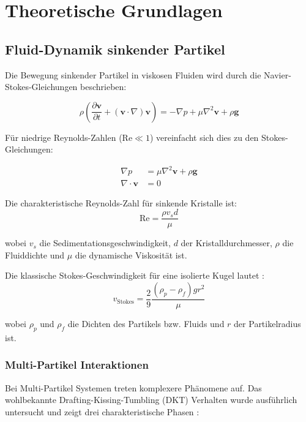 \documentclass[12pt,twoside,openright]{scrreprt}
\newcommand{\grad}{\nabla}
\newcommand{\divg}{\nabla \cdot}
\newcommand{\laplacian}{\nabla^2}
\theoremstyle{definition}
\theoremstyle{plain}
\newcommand{\reynolds}{\text{Re}}
\begin{document}
\chapter{Theoretische Grundlagen}
\label{ch:theory}

\section{Fluid-Dynamik sinkender Partikel}

Die Bewegung sinkender Partikel in viskosen Fluiden wird durch die Navier-Stokes-Gleichungen beschrieben:

\begin{equation}
\rho \left( \frac{\partial \mathbf{v}}{\partial t} + (\mathbf{v} \cdot \grad) \mathbf{v} \right) = -\grad p + \mu \laplacian \mathbf{v} + \rho \mathbf{g}
\end{equation}

Für niedrige Reynolds-Zahlen ($\reynolds \ll 1$) vereinfacht sich dies zu den Stokes-Gleichungen:

\begin{align}
\grad p &= \mu \laplacian \mathbf{v} + \rho \mathbf{g} \\
\divg \mathbf{v} &= 0
\end{align}

Die charakteristische Reynolds-Zahl für sinkende Kristalle ist:
\begin{equation}
\reynolds = \frac{\rho v_s d}{\mu}
\end{equation}

wobei $v_s$ die Sedimentationsgeschwindigkeit, $d$ der Kristalldurchmesser, $\rho$ die Fluiddichte und $\mu$ die dynamische Viskosität ist.

Die klassische Stokes-Geschwindigkeit für eine isolierte Kugel lautet \parencite{stokes1851mathematical}:
\begin{equation}
v_{\text{Stokes}} = \frac{2}{9} \frac{(\rho_p - \rho_f) g r^2}{\mu}
\end{equation}

wobei $\rho_p$ und $\rho_f$ die Dichten des Partikels bzw. Fluids und $r$ der Partikelradius ist.

\subsection{Multi-Partikel Interaktionen}

Bei Multi-Partikel Systemen treten komplexere Phänomene auf. Das wohlbekannte Drafting-Kissing-Tumbling (DKT) Verhalten wurde ausführlich untersucht und zeigt drei charakteristische Phasen \parencite{drafting_kissing_tumbling2022}:
\end{document}
